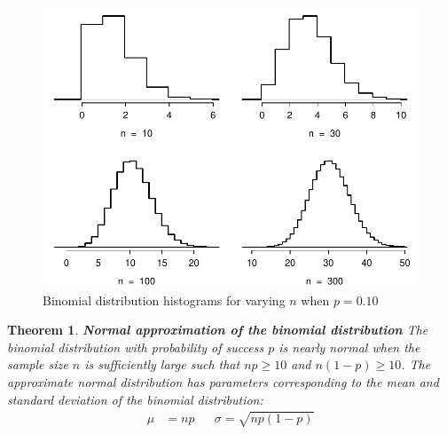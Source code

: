 \documentclass[12pt]{amsart}
\newtheorem{theorem}{Theorem}[section]
\begin{document}
{%
\begin{figure}[h!]
  \includegraphics[width=5in]{img/fourBinomialModelsShowingApproxToNormal.pdf}
  \caption{Binomial distribution histograms for varying $n$ when $p=0.10$}
\end{figure}



\begin{theorem}\textbf{Normal approximation of the binomial distribution}\newline
The binomial distribution with probability of success $p$ is nearly normal when the sample size $n$ is sufficiently large such that $np \geq 10$ and $n(1-p)\geq 10$. \newline
The approximate normal distribution has parameters corresponding to the mean and standard deviation of the binomial distribution:
\begin{align*}
\mu &= np
&&\sigma= \sqrt{np(1-p)}
\end{align*}
\end{theorem}


}
\end{document}
